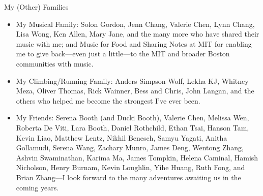 \begin{center}{My (Other) Families}\end{center} 
    \begin{itemize}
    \item My Musical Family: Solon Gordon, Jenn Chang, Valerie Chen, Lynn Chang, Lisa Wong,
        Ken Allen, Mary Jane, and the many more who have shared their music with
            me; and Music for Food and Sharing Notes at MIT for enabling me to
            give back---even just a little---to the MIT and broader Boston
            communities with music.    

    \item My Climbing/Running Family: Anders Simpson-Wolf, Lekha KJ, Whitney Meza, Oliver Thomas, Rick
        Wainner, Bess and Chris, John Langan, and the others who helped
        me become the strongest I've ever been.

    \item My Friends: Serena Booth (and Ducki Booth), Valerie Chen, Melissa Wen, Roberta
        De Viti, Lara Booth, Daniel Rothchild, Ethan Tsai, Hanson Tam, Kevin
            Liao, Matthew Lentz, Nikhil Benesch, Samyu Yagati, Anitha
            Gollamudi, Serena Wang, Zachary Munro, James Deng, Wentong Zhang,
            Ashvin Swaminathan, Karima Ma, James Tompkin, Helena Caminal, Hamish Nicholson,
            Henry Burnam, Kevin Loughlin, Yihe Huang, Ruth Fong, and Brian Zhang---I look forward
            to the many adventures awaiting us in the coming years.
    \end{itemize}

 
